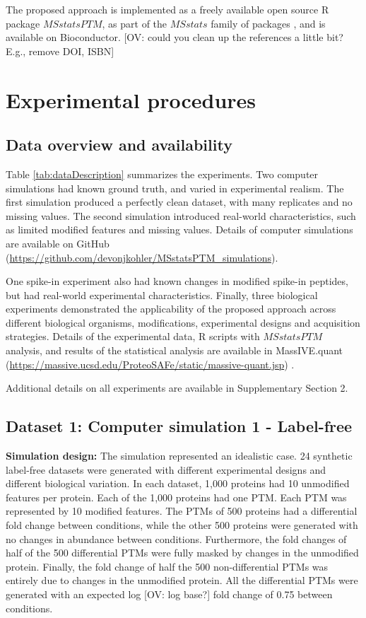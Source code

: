 \documentclass[mcp]{article}
\numberwithin{table}{section}
\def\todo#1{{\color{red}[#1]}}
\begin{document}
The proposed approach is implemented as a freely available open source R package $MSstatsPTM$, as part of the $MSstats$ family of packages \cite{Choi:2014,Huang:2020}, and is available on Bioconductor. \todo{OV: could you clean up the references a little bit? E.g., remove DOI, ISBN}

\section{Experimental procedures}

\subsection*{Data overview and availability}

Table \ref{tab:dataDescription} summarizes the experiments. Two computer simulations had known ground truth, and varied in experimental realism. The first simulation produced a perfectly clean dataset, with many replicates and no missing values. The second simulation introduced real-world characteristics, such as limited modified features and missing values. Details of computer simulations are available on GitHub (\url{https://github.com/devonjkohler/MSstatsPTM_simulations}).

One spike-in experiment also had known changes in modified spike-in peptides, but had real-world experimental characteristics. Finally, three biological experiments demonstrated the applicability of the proposed approach across different biological organisms, modifications, experimental designs and acquisition strategies. Details of the experimental data, R scripts with $MSstatsPTM$ analysis, and results of the statistical analysis are available in MassIVE.quant (\url{https://massive.ucsd.edu/ProteoSAFe/static/massive-quant.jsp}) \cite{Choi:2020}. 

Additional details on all experiments are available in Supplementary Section 2.

\subsection*{Dataset 1: Computer simulation 1 - Label-free}
\label{sec:comp_sim_procedure1}

{\bf Simulation design:} The simulation represented an idealistic case. 24 synthetic label-free datasets were generated with different experimental designs and different biological variation. In each dataset, 1,000 proteins had 10 unmodified features per protein. Each of the 1,000 proteins had one PTM. Each PTM was represented by 10 modified features. The PTMs of 500 proteins had a differential fold change between conditions, while the other 500 proteins were generated with no changes in abundance between conditions. Furthermore, the fold changes of half of the 500 differential PTMs were fully masked by changes in the unmodified protein. Finally, the fold change of half the 500 non-differential PTMs was entirely due to changes in the unmodified protein. All the differential PTMs were generated with an expected log \todo{OV: log base?} fold change of 0.75 between conditions. 
\end{document}
